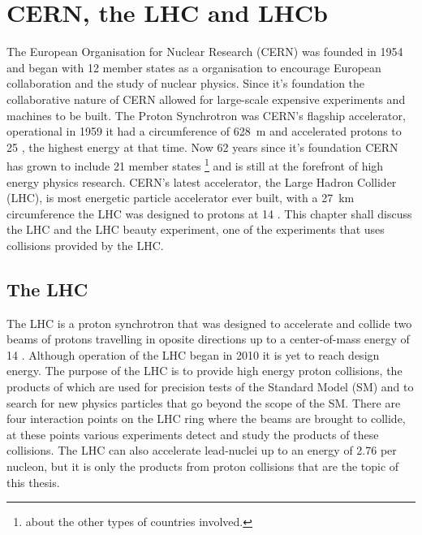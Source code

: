 \chapter{CERN, the LHC and LHCb}
\label{CERN_LHC_LHCb}

The European Organisation for Nuclear Research (CERN) was founded in 1954 and began with 12 member states as a organisation to encourage European collaboration and the study of nuclear physics. Since it's foundation the collaborative nature of CERN allowed for large-scale expensive experiments and machines to be built. The Proton Synchrotron was CERN's flagship accelerator, operational in 1959 it had a circumference of 628~m and accelerated protons to 25 \gev, the highest energy at that time. Now 62 years since it's foundation CERN has grown to include 21 member states \footnote{about the other types of countries involved.} and is still at the forefront of high energy physics research. CERN’s latest accelerator, the Large Hadron Collider (LHC), is most energetic particle accelerator ever built, with a 27~km circumference the LHC was designed to protons at 14 \tev. This chapter shall discuss the LHC and the LHC beauty experiment, one of the experiments that uses collisions provided by the LHC.

\section{The LHC}
\label{LHC}


The LHC is a proton synchrotron that was designed to accelerate and collide two beams of protons travelling in oposite directions up to a center-of-mass energy of 14 \tev. Although operation of the LHC began in 2010 it is yet to reach design energy. The purpose of the LHC is to provide high energy proton collisions, the products of which are used for precision tests of the Standard Model (SM) and to search for new physics particles that go beyond the scope of the SM. There are four interaction points on the LHC ring where the beams are brought to collide, at these points various experiments detect and study the products of these collisions. The LHC can also accelerate lead-nuclei up to an energy of 2.76 \tev per nucleon, but it is only the products from proton collisions that are the topic of this thesis.


